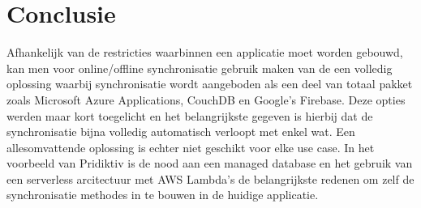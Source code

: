 
\chapter{Conclusie}
\label{ch:conclusie}


Afhankelijk van de restricties waarbinnen een applicatie moet worden gebouwd, kan men voor online/offline synchronisatie gebruik maken van de een volledig oplossing waarbij synchronisatie wordt aangeboden als een deel van totaal pakket zoals Microsoft Azure Applications, CouchDB en Google's Firebase. Deze opties werden maar kort toegelicht en het belangrijkste gegeven is hierbij dat de synchronisatie bijna volledig automatisch verloopt met enkel wat. Een allesomvattende oplossing is echter niet geschikt voor elke use case. In het voorbeeld van Pridiktiv is de nood aan een managed database en het gebruik van een serverless arcitectuur met AWS Lambda's de belangrijkste redenen om zelf de synchronisatie methodes in te bouwen in de huidige applicatie.

